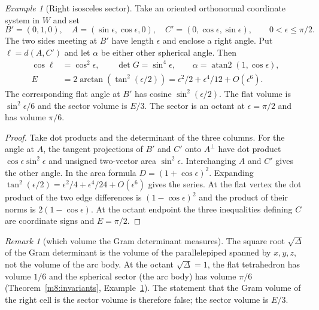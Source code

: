 \documentclass[11pt,reqno]{amsart}
\theoremstyle{definition}
\theoremstyle{remark}
\newtheorem{remark}[theorem]{Remark}
\newtheorem{example}[theorem]{Example}
\numberwithin{equation}{section}
\begin{document}
\begin{example}[Right isosceles sector]\label{m8:right}
Take an oriented orthonormal coordinate system in $W$ and set
\[
 B'=(0,1,0),\quad A=(\sin\epsilon,\cos\epsilon,0),\quad
 C'=(0,\cos\epsilon,\sin\epsilon),\qquad 0<\epsilon\le\pi/2 .
\]
The two sides meeting at $B'$ have length $\epsilon$ and enclose a right
angle. Put $\ell=d(A,C')$ and let $\alpha$ be either other spherical
angle. Then
\begin{align*}
 \cos\ell&=\cos^2\epsilon,\qquad \det G=\sin^4\epsilon,\qquad
 \alpha=\operatorname{atan2}(1,\cos\epsilon),\\
 E&=2\arctan(\tan^2(\epsilon/2))
   =\epsilon^2/2+\epsilon^4/12+O(\epsilon^6).
\end{align*}
The corresponding flat angle at $B'$ has cosine $\sin^2(\epsilon/2)$.
The flat volume is $\sin^2\epsilon/6$ and the sector volume is $E/3$.
The sector is an octant at $\epsilon=\pi/2$ and has volume $\pi/6$.
\end{example}
\begin{proof}
Take dot products and the determinant of the three columns. For the
angle at $A$, the tangent projections of $B'$ and $C'$ onto $A^\perp$
have dot product $\cos\epsilon\sin^2\epsilon$ and unsigned two-vector
area $\sin^2\epsilon$. Interchanging $A$ and $C'$ gives the other
angle. In the area formula $D=(1+\cos\epsilon)^2$.
Expanding $\tan^2(\epsilon/2)=\epsilon^2/4+\epsilon^4/24+O(\epsilon^6)$
gives the series. At the flat vertex the dot product of the two
edge differences is $(1-\cos\epsilon)^2$ and the product of their
norms is $2(1-\cos\epsilon)$. At the octant endpoint the three
inequalities defining $C$ are coordinate signs and $E=\pi/2$.
\end{proof}

\begin{remark}[which volume the Gram determinant measures]\label{m8:volume-note}
The square root $\sqrt\Delta$ of the Gram determinant is the volume of the parallelepiped spanned by $x,y,z$, not the volume of the
arc body.  At the octant $\sqrt\Delta=1$, the flat tetrahedron has volume $1/6$ and the spherical sector (the arc body) has volume
$\pi/6$ (Theorem~\ref{m8:invariants}, Example~\ref{m8:right}).  The statement that the Gram volume of the right cell is the sector
volume is therefore false; the sector volume is $E/3$.
\end{remark}
\end{document}
